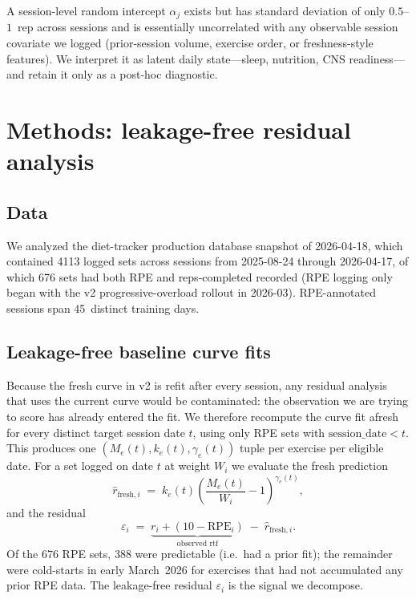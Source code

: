 \documentclass[11pt]{article}
\begin{document}
A session-level random intercept $\alpha_j$ exists but has standard deviation of only $0.5$--$1$~rep across sessions and is essentially uncorrelated with any observable session covariate we logged (prior-session volume, exercise order, or freshness-style features).
We interpret it as latent daily state---sleep, nutrition, CNS readiness---and retain it only as a post-hoc diagnostic.

\section{Methods: leakage-free residual analysis}
\label{sec:methods}

\subsection{Data}
We analyzed the diet-tracker production database snapshot of 2026-04-18, which contained 4113 logged sets across sessions from 2025-08-24 through 2026-04-17, of which 676 sets had both RPE and reps-completed recorded (RPE logging only began with the v2 progressive-overload rollout in 2026-03).
RPE-annotated sessions span 45~distinct training days.

\subsection{Leakage-free baseline curve fits}
Because the fresh curve in v2 is refit after every session, any residual analysis that uses the current curve would be contaminated: the observation we are trying to score has already entered the fit.
We therefore recompute the curve fit afresh for every distinct target session date $t$, using only RPE sets with $\text{session\_date} < t$.
This produces one $(M_e(t), k_e(t), \gamma_e(t))$ tuple per exercise per eligible date.
For a set logged on date $t$ at weight $W_i$ we evaluate the fresh prediction
\begin{equation}
\hat r_{\mathrm{fresh},i} \;=\; k_e(t)\left(\frac{M_e(t)}{W_i}-1\right)^{\!\gamma_e(t)},
\end{equation}
and the residual
\begin{equation}
\varepsilon_i \;=\; \underbrace{r_i + (10 - \mathrm{RPE}_i)}_{\text{observed rtf}} \;-\; \hat r_{\mathrm{fresh},i}.
\end{equation}
Of the 676 RPE sets, 388 were predictable (i.e.\ had a prior fit); the remainder were cold-starts in early March~2026 for exercises that had not accumulated any prior RPE data.
The leakage-free residual $\varepsilon_i$ is the signal we decompose.
\end{document}
